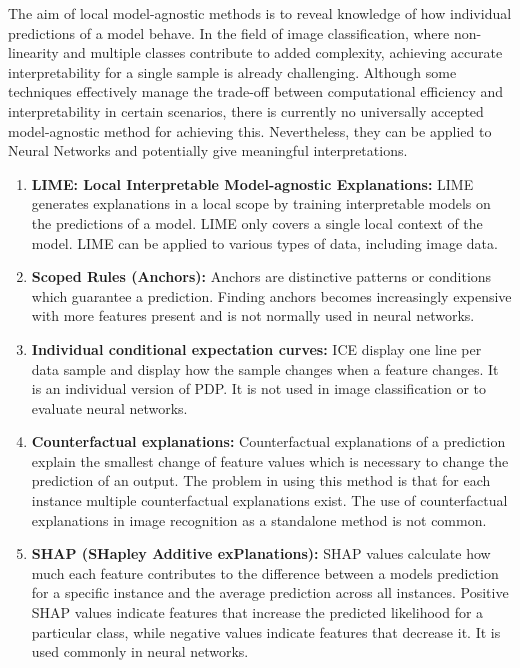 The aim of local model-agnostic methods is to reveal knowledge of how individual predictions of a model behave. In the field of image classification, where non-linearity and multiple classes contribute to added complexity, achieving accurate interpretability for a single sample is already challenging. Although some techniques effectively manage the trade-off between computational efficiency and interpretability in certain scenarios, there is currently no universally accepted model-agnostic method for achieving this. Nevertheless, they can be applied to Neural Networks and potentially give meaningful interpretations.

\begin{enumerate}
	\item \textbf{LIME: Local Interpretable Model-agnostic Explanations:} LIME\cite{ribeiro2016should} generates explanations in a local scope by training interpretable models on the predictions of a model. LIME only covers a single local context of the model. LIME can be applied to various types of data, including image data.
	\item \textbf{Scoped Rules (Anchors):} Anchors \cite{ribeiro2018} are distinctive patterns or conditions which guarantee a prediction. Finding anchors becomes increasingly expensive with more features present and is not normally used in neural networks. 
	\item \textbf{Individual conditional expectation curves:} ICE \cite{goldstein2014peeking} display one line per data sample and display how the sample changes when a feature changes. It is an individual version of PDP. It is not used in image classification or to evaluate neural networks.
	\item \textbf{Counterfactual explanations:} Counterfactual explanations \cite{wachter2017counterfactual} of a prediction explain the smallest change of feature values which is necessary to change the prediction of an output. The problem in using this method is that for each instance multiple counterfactual explanations exist. The use of counterfactual explanations in image recognition as a standalone method is not common.
	\item \textbf{SHAP (SHapley Additive exPlanations):} SHAP values \cite{lundberg2017unified} calculate how much each feature contributes to the difference between a models prediction for a specific instance and the average prediction across all instances. Positive SHAP values indicate features that increase the predicted likelihood for a particular class, while negative values indicate features that decrease it. It is used commonly in neural networks.
\end{enumerate}

